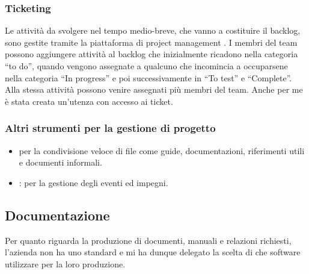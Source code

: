         \subsubsection{Ticketing}
        Le attività da svolgere nel tempo medio-breve, che vanno a costituire il backlog, sono gestite tramite la piattaforma di project management . I membri del team possono aggiungere attività al backlog che inizialmente ricadono nella categoria ``to do'', quando vengono assegnate a qualcuno che incomincia a occuparsene nella categoria ``In progress'' e poi successivamente in ``To test'' e ``Complete''. Alla stessa attività possono venire assegnati più membri del team.
        Anche per me è stata creata un'utenza con accesso ai ticket.
                
        \subsubsection{Altri strumenti per la gestione di progetto}
        \begin{itemize}
            \item {} per la condivisione veloce di file come guide, documentazioni, riferimenti utili e documenti informali.
            \item {}: per la gestione degli eventi ed impegni.
        \end{itemize}
    
    \subsection{Documentazione}
        Per quanto riguarda la produzione di documenti, manuali e relazioni richiesti, l'azienda non ha uno standard e mi ha dunque delegato la scelta di che software utilizzare per la loro produzione. 
